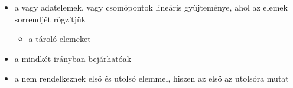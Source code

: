 \documentclass[main.tex]{subfiles}
\begin{document}
  \begin{itemize}
    \item a  vagy 
    adatelemek, vagy csomópontok lineáris gyűjteménye,
    ahol az elemek sorrendjét rögzítjük
    \begin{itemize}
      \item a  tároló elemeket
    \end{itemize}

    \item a  mindkét irányban bejárhatóak
    
    \item a  nem rendelkeznek
    első és utolsó elemmel, hiszen az első az utolsóra mutat
  \end{itemize}
\end{document}
